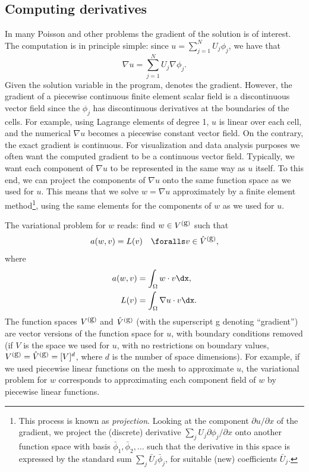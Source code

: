 \subsection{Computing derivatives}
\label{langtangen:poisson:gradu}

In many Poisson and other problems the gradient of the solution is of
interest. The computation is in principle simple: since $u = \sum_{j=1}^N
U_j \phi_j$, we have that
\begin{equation}
  \nabla u = \sum_{j=1}^N U_j \nabla \phi_j.
\end{equation}
Given the solution variable  in the program,  denotes
the gradient. However, the gradient of a piecewise continuous finite
element scalar field is a discontinuous vector field since the $\phi_j$
has discontinuous derivatives at the boundaries of the cells. For example,
using Lagrange elements of degree 1, $u$ is linear over each cell, and
the numerical $\nabla u$ becomes a piecewise constant vector field. On
the contrary, the exact gradient is continuous.  For visualization
and data analysis purposes we often want the computed gradient to be a
continuous vector field. Typically, we want each component of $\nabla
u$ to be represented in the same way as $u$ itself. To this end,
we can project the components of $\nabla u$ onto the same function
space as we used for $u$.  This means that we solve $w = \nabla u$
approximately by a finite element method\footnote{This process is known as
\emph{projection}.  Looking at the component $\partial
u/\partial x$ of the gradient, we project the (discrete) derivative
$\sum_jU_j{\partial \phi_j/\partial x}$ onto another function space
with basis $\bar\phi_1,\bar\phi_2,\ldots$ such that the derivative in
this space is expressed by the standard sum $\sum_j\bar U_j\bar \phi_j$,
for suitable (new) coefficients $\bar U_j$.}, using the same elements
for the components of $w$ as we used for $u$.

The variational problem for $w$ reads: find $w\in V^{(\mbox{g})}$ such that
\begin{equation}
  a(w, v) = L(v)\quad\foralls v\in \Vghat,
\end{equation}
where
\begin{align}
  a(w, v) &= \int_\Omega w\cdot v\dx,
\\
  L(v) &= \int_\Omega \nabla u\cdot v\dx.
\end{align}
The function spaces $V^{(\mbox{g})}$ and $\hat{V}^{(\mbox{g})}$ (with the superscript g denoting
``gradient'') are vector versions of the function space for $u$, with
boundary conditions removed (if $V$ is the space we used for $u$, with
no restrictions on boundary values, $ V^{(\mbox{g})} = \hat{V}^{(\mbox{g})} = [V]^d$, where $d$
is the number of space dimensions).  For example, if we used piecewise
linear functions on the mesh to approximate $u$, the variational problem
for $w$ corresponds to approximating each component field of $w$ by
piecewise linear functions.

